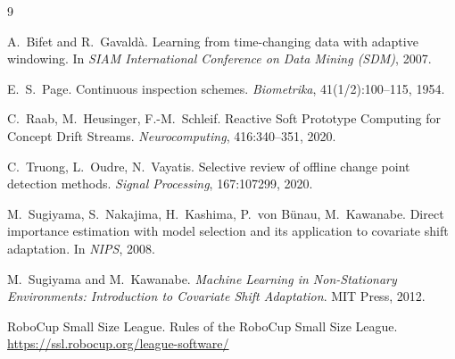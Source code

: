 \documentclass[11pt,a4paper]{article}
\begin{document}
\begin{thebibliography}{9}

A.~Bifet and R.~Gavald\`a.
\newblock Learning from time-changing data with adaptive windowing.
\newblock In \emph{SIAM International Conference on Data Mining (SDM)}, 2007.

E.~S.~Page.
\newblock Continuous inspection schemes.
\newblock \emph{Biometrika}, 41(1/2):100--115, 1954.

C.~Raab, M.~Heusinger, F.-M.~Schleif.
\newblock Reactive Soft Prototype Computing for Concept Drift Streams.
\newblock \emph{Neurocomputing}, 416:340--351, 2020.

C.~Truong, L.~Oudre, N.~Vayatis.
\newblock Selective review of offline change point detection methods.
\newblock \emph{Signal Processing}, 167:107299, 2020.

M.~Sugiyama, S.~Nakajima, H.~Kashima, P.~von B\"unau, M.~Kawanabe.
\newblock Direct importance estimation with model selection and its
         application to covariate shift adaptation.
\newblock In \emph{NIPS}, 2008.

M.~Sugiyama and M.~Kawanabe.
\newblock \emph{Machine Learning in Non-Stationary Environments: Introduction
         to Covariate Shift Adaptation}.
\newblock MIT Press, 2012.

RoboCup Small Size League.
\newblock Rules of the RoboCup Small Size League. \\
\newblock \url{https://ssl.robocup.org/league-software/}

\end{thebibliography}
\end{document}
